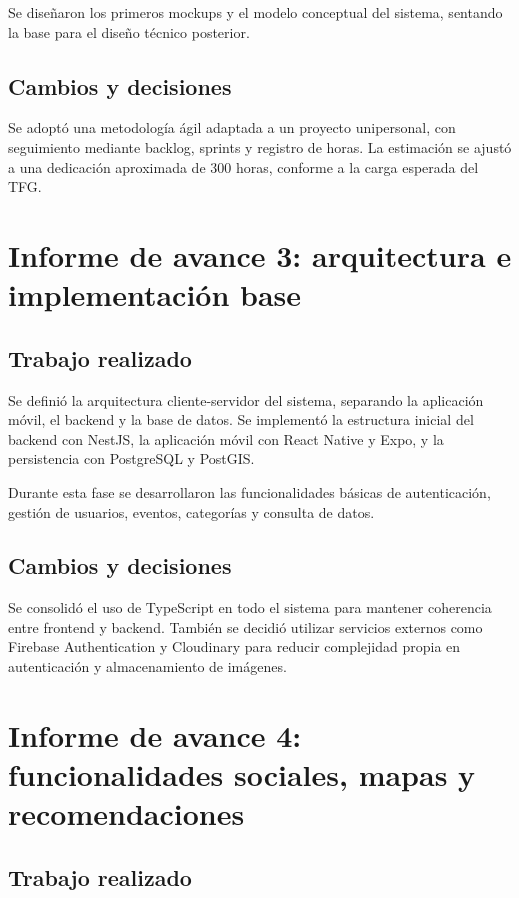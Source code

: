 Se diseñaron los primeros mockups y el modelo conceptual del sistema, sentando la base para el diseño técnico posterior.

\subsection{Cambios y decisiones}

Se adoptó una metodología ágil adaptada a un proyecto unipersonal, con seguimiento mediante backlog, sprints y registro de horas. La estimación se ajustó a una dedicación aproximada de 300 horas, conforme a la carga esperada del TFG.

\section{Informe de avance 3: arquitectura e implementación base}

\subsection{Trabajo realizado}

Se definió la arquitectura cliente-servidor del sistema, separando la aplicación móvil, el backend y la base de datos. Se implementó la estructura inicial del backend con NestJS, la aplicación móvil con React Native y Expo, y la persistencia con PostgreSQL y PostGIS.

Durante esta fase se desarrollaron las funcionalidades básicas de autenticación, gestión de usuarios, eventos, categorías y consulta de datos.

\subsection{Cambios y decisiones}

Se consolidó el uso de TypeScript en todo el sistema para mantener coherencia entre frontend y backend. También se decidió utilizar servicios externos como Firebase Authentication y Cloudinary para reducir complejidad propia en autenticación y almacenamiento de imágenes.

\section{Informe de avance 4: funcionalidades sociales, mapas y recomendaciones}

\subsection{Trabajo realizado}

